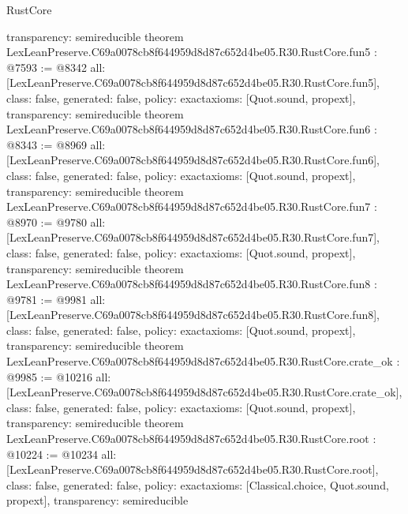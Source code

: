 \begin{lexlean}{RustCore}
\begin{coremodule}
{  transparency: semireducible
}
theorem LexLeanPreserve.C69a0078cb8f644959d8d87c652d4be05.R30.RustCore.fun5 : @7593 := @8342 {
  all: [LexLeanPreserve.C69a0078cb8f644959d8d87c652d4be05.R30.RustCore.fun5],
  class: false,
  generated: false,
  policy: exact{axioms: [Quot.sound, propext]},
  transparency: semireducible
}
theorem LexLeanPreserve.C69a0078cb8f644959d8d87c652d4be05.R30.RustCore.fun6 : @8343 := @8969 {
  all: [LexLeanPreserve.C69a0078cb8f644959d8d87c652d4be05.R30.RustCore.fun6],
  class: false,
  generated: false,
  policy: exact{axioms: [Quot.sound, propext]},
  transparency: semireducible
}
theorem LexLeanPreserve.C69a0078cb8f644959d8d87c652d4be05.R30.RustCore.fun7 : @8970 := @9780 {
  all: [LexLeanPreserve.C69a0078cb8f644959d8d87c652d4be05.R30.RustCore.fun7],
  class: false,
  generated: false,
  policy: exact{axioms: [Quot.sound, propext]},
  transparency: semireducible
}
theorem LexLeanPreserve.C69a0078cb8f644959d8d87c652d4be05.R30.RustCore.fun8 : @9781 := @9981 {
  all: [LexLeanPreserve.C69a0078cb8f644959d8d87c652d4be05.R30.RustCore.fun8],
  class: false,
  generated: false,
  policy: exact{axioms: [Quot.sound, propext]},
  transparency: semireducible
}
theorem LexLeanPreserve.C69a0078cb8f644959d8d87c652d4be05.R30.RustCore.crate_ok : @9985 := @10216 {
  all: [LexLeanPreserve.C69a0078cb8f644959d8d87c652d4be05.R30.RustCore.crate_ok],
  class: false,
  generated: false,
  policy: exact{axioms: [Quot.sound, propext]},
  transparency: semireducible
}
theorem LexLeanPreserve.C69a0078cb8f644959d8d87c652d4be05.R30.RustCore.root : @10224 := @10234 {
  all: [LexLeanPreserve.C69a0078cb8f644959d8d87c652d4be05.R30.RustCore.root],
  class: false,
  generated: false,
  policy: exact{axioms: [Classical.choice, Quot.sound, propext]},
  transparency: semireducible
}


\end{coremodule}
\end{lexlean}
